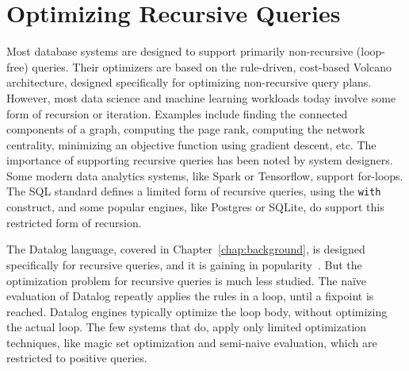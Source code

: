 \chapter{Optimizing Recursive Queries}
\label{chapter:fgh}

Most database systems are designed to support primarily non-recursive
(loop-free) queries.  Their optimizers are based on the rule-driven,
cost-based Volcano architecture, designed specifically for optimizing
non-recursive query plans.  However, most data science and machine
learning workloads today involve some form of recursion or iteration.
Examples include finding the connected components of a graph,
computing the page rank, computing the network centrality, minimizing
an objective function using gradient descent, etc.  The importance of
supporting recursive queries has been noted by system designers.
Some modern data analytics systems, like Spark or Tensorflow, support
for-loops. The SQL standard defines a limited
form of recursive queries, using the
\texttt{with} construct, and some popular engines, like Postgres or
SQLite, do support this restricted form of recursion.

%
The Datalog language, covered in Chapter~\ref{chap:background}, is
designed specifically for recursive queries, and it is gaining in
popularity~\cite{DBLP:conf/datalog/AlvaroMCHMS10,
DBLP:reference/db/RoscoeL18,
10.1145/3452021.3458815,
10.1145/1989323.1989456,
BigDatalog,
DBLP:journals/pvldb/FanZZAKP19,
DBLP:journals/tkde/SeoGL15,
10.14778/2824032.2824052,
francislandau-vieira-eisner-2020-wrla}.
But the optimization problem for recursive queries is
much less studied.  
The na\"ive evaluation of Datalog repeatly applies the 
 rules in a loop, until a fixpoint is reached. 
Datalog engines typically optimize the loop body, without optimizing
the actual loop.  The few systems that do,
apply only limited optimization techniques, like magic set optimization and
semi-naive evaluation, which are restricted to positive queries.

